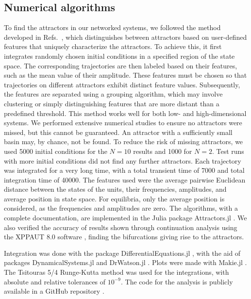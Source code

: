 \subsection{Numerical algorithms}

To find the attractors in our networked systems, we followed the method developed in Refs.~\cite{datseris2023framework, gelbrecht2020monte, stender2021bstab}, which distinguishes between attractors based on user-defined features that uniquely characterize the attractors. To achieve this, it first integrates randomly chosen initial conditions in a specified region of the state space. The corresponding trajectories are then labeled based on their features, such as the mean value of their amplitude. These features must be chosen so that trajectories on different attractors exhibit distinct feature values. Subsequently, the features are separated using a grouping algorithm, which may involve clustering or simply distinguishing features that are more distant than a predefined threshold. This method works well for both low- and high-dimensional systems. We performed extensive numerical studies to ensure no attractors were missed, but this cannot be guaranteed. An attractor with a sufficiently small basin may, by chance, not be found. To reduce the risk of missing attractors, we used 5000 initial conditions for the $N=10$ results and 1000 for $N=2$. Test runs with more initial conditions did not find any further attractors. Each trajectory was integrated for a very long time, with a total transient time of 7000 and total integration time of 40000. The features used were the average pairwise Euclidean distance between the states of the units, their frequencies, amplitudes, and average position in state space. For equilibria, only the average position is considered, as the frequencies and amplitudes are zero. The algorithms, with a complete documentation, are implemented in the Julia \cite{bezanson2017julia} package Attractors.jl \cite{datseris2022effortless, datseris2023framework}. We also verified the accuracy of results shown through continuation analysis using the XPPAUT 8.0 software \cite{ermentrout2002simulating}, finding the bifurcations giving rise to the attractors.

Integration was done with the package DifferentialEquations.jl \cite{rackauckas2016differential}, with the aid of packages DynamicalSystems.jl \cite{datseris2018dynamical} and DrWatson.jl \cite{datseris2020drwatson}. Plots were made with Makie.jl \cite{danisch2021makie}. The Tsitouras 5/4 Runge-Kutta method was used for the integrations, with absolute and relative tolerances of $10^{-9}$. The code for the analysis is publicly available in a GitHub repository \cite{rossi2024multistabilitygithub}.


